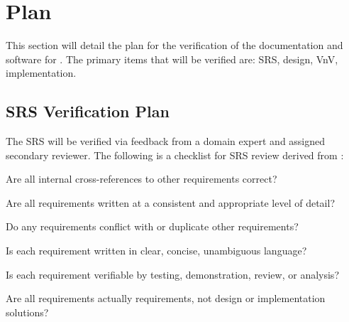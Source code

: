 \documentclass[12pt, titlepage]{article}
\begin{document}

\section{Plan} \label{sec:plan}

This section will detail the plan for the verification of the documentation and software for
\progname{}. The primary items that will be verified are: SRS, design, VnV, implementation.




\subsection{SRS Verification Plan}

The SRS \citep{SRS} will be verified via feedback from a domain expert and assigned secondary
reviewer. The following is a checklist for SRS review derived from \citep{wiegers2002peer}:

\begin{todolist}
    \item Are all internal cross-references to other requirements correct?
    \item Are all requirements written at a consistent and appropriate level of detail?
    \item Do any requirements conflict with or duplicate other requirements?
    \item Is each requirement written in clear, concise, unambiguous language?
    \item Is each requirement verifiable by testing, demonstration, review, or analysis?
    \item Are all requirements actually requirements, not design or implementation solutions?
\end{todolist}
\end{document}
